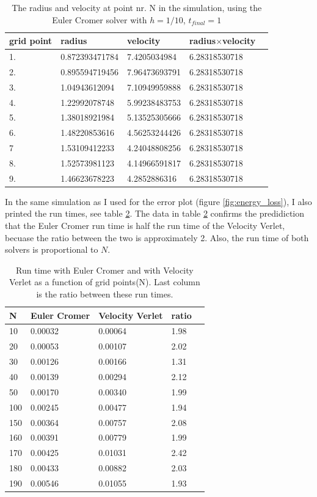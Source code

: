 \documentclass{article}
\begin{document}
\begin{table}[h!]
  \centering
  \caption{The radius and velocity at point nr. N in the simulation, using the Euler Cromer solver with $h=1/10$, $t_{final} = 1 $}
  \label{tab:table3}
  \begin{tabular}{l||l|l|l|l}
grid point & radius & velocity & radius$\times$velocity \\
\hline
1. & 0.872393471784 & 7.4205034984 & 6.28318530718 \\
2. & 0.895594719456 & 7.96473693791 & 6.28318530718 \\
3. & 1.04943612094 & 7.10949959888 & 6.28318530718 \\
4. &1.22992078748 & 5.99238483753 & 6.28318530718 \\
5.& 1.38018921984 & 5.13525305666 & 6.28318530718 \\
6.& 1.48220853616 & 4.56253244426 & 6.28318530718 \\
7 & 1.53109412233 & 4.24048808256 & 6.28318530718 \\
8.& 1.52573981123 & 4.14966591817 & 6.28318530718 \\
9. & 1.46623678223 & 4.2852886316 & 6.28318530718 \\

 \end{tabular}
\end{table}

In the same simulation as I used for the error plot (figure \ref{fig:energy_loss}), I also printed the run times, see table \ref{tab:time}. The data in table \ref{tab:time} confirms the predidiction that the Euler Cromer run time is half the run time of the Velocity Verlet, becuase the ratio between the two is approximately 2. Also, the run time of both solvers is proportional to $N$. 
\begin{table}[h!]
  \centering
  \caption{Run time with Euler Cromer and with Velocity Verlet as a function of grid points(N). Last column is the ratio between these run times.  }
  \label{tab:time}
  \begin{tabular}{l||l|l|l|l}
N & Euler Cromer & Velocity Verlet & ratio \\
\hline
10 &0.00032 & 0.00064 &1.98 \\
20 &0.00053 & 0.00107 &2.02 \\
30 &0.00126 &0.00166 &1.31 \\
40 &0.00139 &0.00294 &2.12 \\
50 &0.00170 &0.00340 &1.99 \\
\hline
100 & 0.00245 &0.00477 &1.94 \\
\hline
150 &0.00364 &0.00757 &2.08\\
160 &0.00391 &0.00779 &1.99\\
170 &0.00425 &0.01031 &2.42\\
180 &0.00433 &0.00882 &2.03\\
190 &0.00546 &0.01055 &1.93\\

 \end{tabular}
\end{table}
\end{document}

